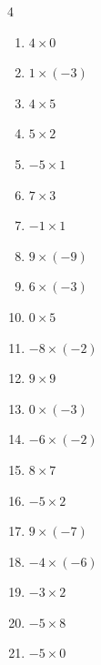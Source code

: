 \begin{multicols}{4}
\begin{enumerate}
  \item $4\times 0$
        \phantom{$=0$}

  \item $1\times (-3)$
        \phantom{$=-3$}

  \item $4\times 5$
        \phantom{$=20$}

  \item $5\times 2$
        \phantom{$=10$}

  \item $-5\times 1$
        \phantom{$=-5$}

  \item $7\times 3$
        \phantom{$=21$}

  \item $-1\times 1$
        \phantom{$=-1$}

  \item $9\times (-9)$
        \phantom{$=-81$}

  \item $6\times (-3)$
        \phantom{$=-18$}

  \item $0\times 5$
        \phantom{$=0$}

  \item $-8\times (-2)$
        \phantom{$=16$}

  \item $9\times 9$
        \phantom{$=81$}

  \item $0\times (-3)$
        \phantom{$=0$}

  \item $-6\times (-2)$
        \phantom{$=12$}

  \item $8\times 7$
        \phantom{$=56$}

  \item $-5\times 2$
        \phantom{$=-10$}

  \item $9\times (-7)$
        \phantom{$=-63$}

  \item $-4\times (-6)$
        \phantom{$=24$}

  \item $-3\times 2$
        \phantom{$=-6$}

  \item $-5\times 8$
        \phantom{$=-40$}

  \item $-5\times 0$
        \phantom{$=0$}


\end{enumerate}
\end{multicols}
